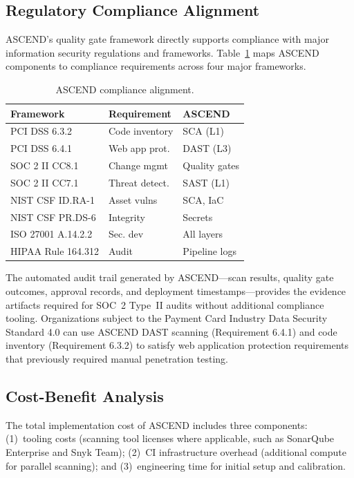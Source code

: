 \documentclass{ieeeaccess}
\begin{document}
\subsection{Regulatory Compliance Alignment}
ASCEND's quality gate framework directly supports compliance with major information security regulations and frameworks. Table~\ref{tab:compliance} maps ASCEND components to compliance requirements across four major frameworks.

\begin{table}[!t]
\caption{ASCEND compliance alignment.}
\label{tab:compliance}
\centering
\begin{tabular}{lll}
\hline
\textbf{Framework} & \textbf{Requirement} & \textbf{ASCEND} \\
\hline
PCI DSS 6.3.2     & Code inventory  & SCA (L1)        \\
PCI DSS 6.4.1     & Web app prot.   & DAST (L3)       \\
SOC 2 II CC8.1    & Change mgmt     & Quality gates   \\
SOC 2 II CC7.1    & Threat detect.  & SAST (L1)       \\
NIST CSF ID.RA-1  & Asset vulns     & SCA, IaC        \\
NIST CSF PR.DS-6  & Integrity       & Secrets         \\
ISO 27001 A.14.2.2 & Sec. dev       & All layers      \\
HIPAA Rule 164.312 & Audit          & Pipeline logs   \\
\hline
\end{tabular}
\end{table}

The automated audit trail generated by ASCEND---scan results, quality gate outcomes, approval records, and deployment timestamps---provides the evidence artifacts required for SOC~2 Type~II audits without additional compliance tooling. Organizations subject to the Payment Card Industry Data Security Standard 4.0 can use ASCEND DAST scanning (Requirement 6.4.1) and code inventory (Requirement 6.3.2) to satisfy web application protection requirements that previously required manual penetration testing.

\subsection{Cost-Benefit Analysis}
The total implementation cost of ASCEND includes three components: (1)~tooling costs (scanning tool licenses where applicable, such as SonarQube Enterprise and Snyk Team); (2)~CI infrastructure overhead (additional compute for parallel scanning); and (3)~engineering time for initial setup and calibration.
\end{document}
